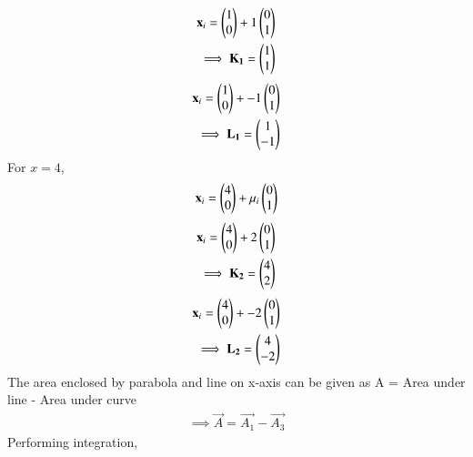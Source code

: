\begin{align}
\mathbf{x}_i = \begin{pmatrix}1\\0\end{pmatrix} + 1\begin{pmatrix}0\\1\end{pmatrix}\\
\implies\mathbf{K_1}=\begin{pmatrix}1\\1\end{pmatrix}
\end{align}
\begin{align}
\mathbf{x}_i = \begin{pmatrix}1\\0\end{pmatrix} + -1\begin{pmatrix}0\\1\end{pmatrix}\\
\implies\mathbf{L_1}=\begin{pmatrix}1\\-1\end{pmatrix}
\end{align}
For $x= 4$, 
\begin{align}\label{sep/2/7/eq:para2}
\mathbf{x}_i = \begin{pmatrix} 4\\ 0\end{pmatrix} + \mu_i \begin{pmatrix}0\\1\end{pmatrix}
\end{align}
\begin{align}
\mathbf{x}_i = \begin{pmatrix}4\\0\end{pmatrix} + 2\begin{pmatrix}0\\1\end{pmatrix}\\
\implies\mathbf{K_2}=\begin{pmatrix}4\\2\end{pmatrix}
\end{align}
\begin{align}
\mathbf{x}_i = \begin{pmatrix}4\\0\end{pmatrix} + -2\begin{pmatrix}0\\1\end{pmatrix}\\
\implies\mathbf{L_2}=\begin{pmatrix}4\\-2\end{pmatrix}
\end{align}
The area enclosed by parabola and line on x-axis can be given as
A = Area under line - Area under curve
\begin{align}
\implies\boxed{\vec{A} = \vec{A_1}-\vec{A_3}} \label{sep/2/7/eq:A}
\end{align}
%
Performing integration,


